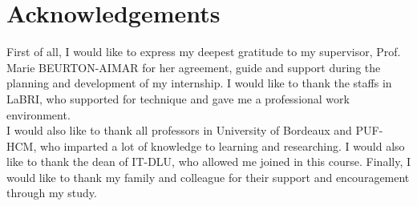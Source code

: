 \chapter*{Acknowledgements}
\thispagestyle{empty}
\indent First of all, I would like to express my deepest gratitude to my supervisor, Prof. Marie BEURTON-AIMAR for her agreement, guide and support during the planning and development of my internship. I would like to thank the staffs in LaBRI, who supported for technique and gave me a professional work environment. 
\\[0.3cm]
I would also like to thank all professors in University of Bordeaux and PUF-HCM, who imparted a lot of knowledge to learning and researching. I would also like to thank the dean of IT-DLU, who allowed me joined in this course. 
Finally, I would like to thank my family and colleague for their support and encouragement through my study.
\clearpage